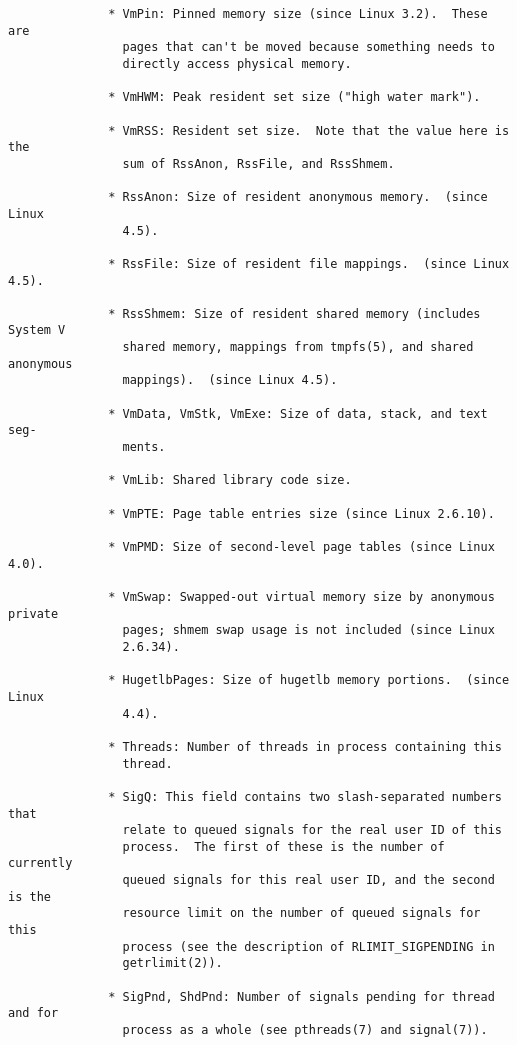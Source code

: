 \documentclass[]{article}
\begin{document}
\begin{verbatim}
              * VmPin: Pinned memory size (since Linux 3.2).  These are
                pages that can't be moved because something needs to
                directly access physical memory.

              * VmHWM: Peak resident set size ("high water mark").

              * VmRSS: Resident set size.  Note that the value here is the
                sum of RssAnon, RssFile, and RssShmem.

              * RssAnon: Size of resident anonymous memory.  (since Linux
                4.5).

              * RssFile: Size of resident file mappings.  (since Linux 4.5).

              * RssShmem: Size of resident shared memory (includes System V
                shared memory, mappings from tmpfs(5), and shared anonymous
                mappings).  (since Linux 4.5).

              * VmData, VmStk, VmExe: Size of data, stack, and text seg‐
                ments.

              * VmLib: Shared library code size.

              * VmPTE: Page table entries size (since Linux 2.6.10).

              * VmPMD: Size of second-level page tables (since Linux 4.0).

              * VmSwap: Swapped-out virtual memory size by anonymous private
                pages; shmem swap usage is not included (since Linux
                2.6.34).

              * HugetlbPages: Size of hugetlb memory portions.  (since Linux
                4.4).

              * Threads: Number of threads in process containing this
                thread.

              * SigQ: This field contains two slash-separated numbers that
                relate to queued signals for the real user ID of this
                process.  The first of these is the number of currently
                queued signals for this real user ID, and the second is the
                resource limit on the number of queued signals for this
                process (see the description of RLIMIT_SIGPENDING in
                getrlimit(2)).

              * SigPnd, ShdPnd: Number of signals pending for thread and for
                process as a whole (see pthreads(7) and signal(7)).


\end{verbatim}
\end{document}
